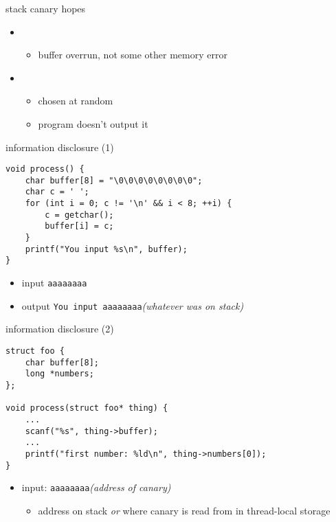 \begin{frame}{stack canary hopes}
    \begin{itemize}
    \item {}
        \begin{itemize}
        \item<2-> buffer overrun, not some other memory error
        \end{itemize}
    \item {}
        \begin{itemize}
        \item<3-> chosen at random
        \item<3-> program doesn't output it
        \end{itemize}
    \end{itemize}
\end{frame}

\begin{frame}[fragile,label=infoDisc1]{information disclosure (1)}
\lstset{
    language=C,
    style=small
}
\begin{lstlisting}
void process() {
    char buffer[8] = "\0\0\0\0\0\0\0\0";
    char c = ' ';
    for (int i = 0; c != '\n' && i < 8; ++i) {
        c = getchar();
        buffer[i] = c;
    }
    printf("You input %s\n", buffer);
}
\end{lstlisting}
\begin{itemize}
\item input \verb|aaaaaaaa|
\item output \verb|You input aaaaaaaa|{\it (whatever was on stack)}
\end{itemize}
\end{frame}

\begin{frame}[fragile,label=infoDisc2]{information disclosure (2)}
\lstset{
    language=C,
    style=small,
}
\begin{lstlisting}
struct foo {
    char buffer[8];
    long *numbers;
};

void process(struct foo* thing) {
    ...
    scanf("%s", thing->buffer);
    ...
    printf("first number: %ld\n", thing->numbers[0]);
}
\end{lstlisting}
\begin{itemize}
\item input: {\tt aaaaaaaa}\textit{(address of canary)}
    \begin{itemize}
    \item address on stack \textit{or} where canary is read from in thread-local storage
    \end{itemize}
\end{itemize}
\end{frame}

